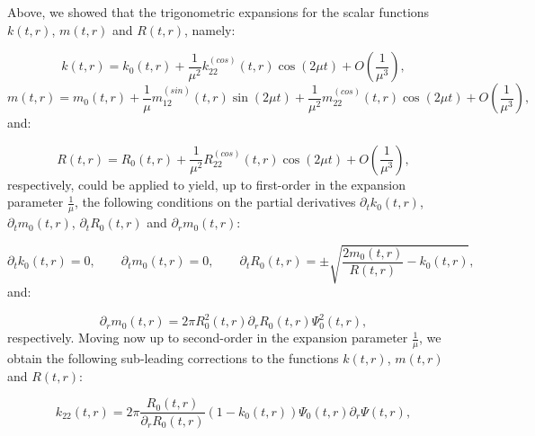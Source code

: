 \documentclass{article}
\begin{document}
Above, we showed that the trigonometric expansions for the scalar functions ${k \left( t, r \right)}$, ${m \left( t, r \right)}$ and ${R \left( t, r \right)}$, namely:

\begin{equation}
k \left( t, r \right) = k_0 \left( t, r \right) + \frac{1}{\mu^2} k_{2 2}^{\left( cos \right)} \left( t, r \right) \cos \left( 2 \mu t \right) + O \left( \frac{1}{\mu^3} \right),
\end{equation}
\begin{equation}
m \left( t, r \right) = m_0 \left( t, r \right) + \frac{1}{\mu} m_{1 2}^{\left( sin \right)} \left( t, r \right) \sin \left( 2 \mu t \right) + \frac{1}{\mu^2} m_{2 2}^{\left( cos \right)} \left( t, r \right) \cos \left( 2 \mu t \right) + O \left( \frac{1}{\mu^3} \right),
\end{equation}
and:

\begin{equation}
R \left( t, r \right) = R_0 \left( t, r \right) + \frac{1}{\mu^2} R_{2 2}^{\left( cos \right)} \left( t, r \right) \cos \left( 2 \mu t \right) + O \left( \frac{1}{\mu^3} \right),
\end{equation}
respectively, could be applied to yield, up to first-order in the expansion parameter ${\frac{1}{\mu}}$, the following conditions on the partial derivatives ${\partial_t k_0 \left( t, r \right)}$, ${\partial_t m_0 \left( t, r \right)}$, ${\partial_t R_0 \left( t, r \right)}$ and ${\partial_r m_0 \left( t, r \right)}$:

\begin{equation}
\partial_t k_0 \left( t, r \right) = 0, \qquad \partial_t m_0 \left( t, r \right) = 0, \qquad \partial_t R_0 \left( t, r \right) = \pm \sqrt{\frac{2 m_0 \left( t, r \right)}{R \left( t, r \right)} - k_0 \left( t, r \right)},
\end{equation}
and:

\begin{equation}
\partial_r m_0 \left( t, r \right) = 2 \pi R_{0}^{2} \left( t, r \right) \partial_r R_0 \left( t, r \right) \Psi_{0}^{2} \left( t, r \right),
\end{equation}
respectively. Moving now up to second-order in the expansion parameter ${\frac{1}{\mu}}$, we obtain the following sub-leading corrections to the functions ${k \left( t, r \right)}$, ${m \left( t, r \right)}$ and ${R \left( t, r \right)}$:

\begin{equation}
k_{2 2} \left( t, r \right) = 2 \pi \frac{R_0 \left( t, r \right)}{\partial_r R_0 \left( t, r \right)} \left( 1 - k_0 \left( t, r \right) \right) \Psi_0 \left( t, r \right) \partial_r \Psi \left( t, r \right),
\end{equation}
\end{document}
